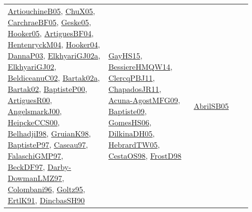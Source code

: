 {\begin{longtable}{lp{3cm}>{\raggedright}p{6cm}>{\raggedright}p{6cm}p{8cm}}
\href{papers/ArtiouchineB05.pdf}{ArtiouchineB05}\cite{ArtiouchineB05}, \href{papers/ChuX05.pdf}{ChuX05}\cite{ChuX05}, \href{papers/CarchraeBF05.pdf}{CarchraeBF05}\cite{CarchraeBF05}, \href{papers/Geske05.pdf}{Geske05}\cite{Geske05}, \href{articles/Hooker05.pdf}{Hooker05}\cite{Hooker05}, \href{papers/ArtiguesBF04.pdf}{ArtiguesBF04}\cite{ArtiguesBF04}, \href{papers/HentenryckM04.pdf}{HentenryckM04}\cite{HentenryckM04}, \href{papers/Hooker04.pdf}{Hooker04}\cite{Hooker04}, \href{papers/DannaP03.pdf}{DannaP03}\cite{DannaP03}, \href{papers/ElkhyariGJ02a.pdf}{ElkhyariGJ02a}\cite{ElkhyariGJ02a}, \href{papers/ElkhyariGJ02.pdf}{ElkhyariGJ02}\cite{ElkhyariGJ02}, \href{papers/BeldiceanuC02.pdf}{BeldiceanuC02}\cite{BeldiceanuC02}, \href{papers/Bartak02a.pdf}{Bartak02a}\cite{Bartak02a}, \href{papers/Bartak02.pdf}{Bartak02}\cite{Bartak02}, \href{articles/BaptisteP00.pdf}{BaptisteP00}\cite{BaptisteP00}, \href{articles/ArtiguesR00.pdf}{ArtiguesR00}\cite{ArtiguesR00}, \href{papers/AngelsmarkJ00.pdf}{AngelsmarkJ00}\cite{AngelsmarkJ00}, \href{articles/HeipckeCCS00.pdf}{HeipckeCCS00}\cite{HeipckeCCS00}, \href{articles/BelhadjiI98.pdf}{BelhadjiI98}\cite{BelhadjiI98}, \href{papers/GruianK98.pdf}{GruianK98}\cite{GruianK98}, \href{papers/BaptisteP97.pdf}{BaptisteP97}\cite{BaptisteP97}, \href{papers/Caseau97.pdf}{Caseau97}\cite{Caseau97}, \href{articles/FalaschiGMP97.pdf}{FalaschiGMP97}\cite{FalaschiGMP97}, \href{papers/BeckDF97.pdf}{BeckDF97}\cite{BeckDF97}, \href{articles/Darby-DowmanLMZ97.pdf}{Darby-DowmanLMZ97}\cite{Darby-DowmanLMZ97}, \href{papers/Colombani96.pdf}{Colombani96}\cite{Colombani96}, \href{papers/Goltz95.pdf}{Goltz95}\cite{Goltz95}, \href{papers/ErtlK91.pdf}{ErtlK91}\cite{ErtlK91}, \href{articles/DincbasSH90.pdf}{DincbasSH90}\cite{DincbasSH90} & \href{papers/GayHS15.pdf}{GayHS15}\cite{GayHS15}, \href{papers/BessiereHMQW14.pdf}{BessiereHMQW14}\cite{BessiereHMQW14}, \href{papers/ClercqPBJ11.pdf}{ClercqPBJ11}\cite{ClercqPBJ11}, \href{papers/ChapadosJR11.pdf}{ChapadosJR11}\cite{ChapadosJR11}, \href{papers/Acuna-AgostMFG09.pdf}{Acuna-AgostMFG09}\cite{Acuna-AgostMFG09}, \href{papers/Baptiste09.pdf}{Baptiste09}\cite{Baptiste09}, \href{papers/GomesHS06.pdf}{GomesHS06}\cite{GomesHS06}, \href{papers/DilkinaDH05.pdf}{DilkinaDH05}\cite{DilkinaDH05}, \href{papers/HebrardTW05.pdf}{HebrardTW05}\cite{HebrardTW05}, \href{papers/CestaOS98.pdf}{CestaOS98}\cite{CestaOS98}, \href{papers/FrostD98.pdf}{FrostD98}\cite{FrostD98} & \href{papers/AbrilSB05.pdf}{AbrilSB05}\cite{AbrilSB05}\\

\end{longtable}}
